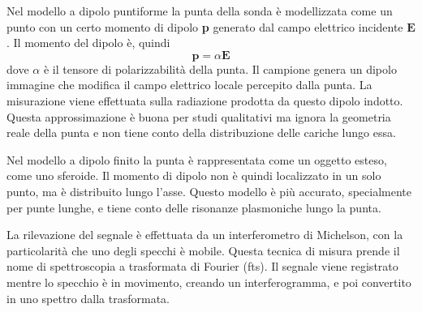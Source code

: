 \documentclass[../main.tex]{subfiles}
\begin{document}
Nel modello a dipolo puntiforme la punta della sonda è modellizzata come un punto con un certo momento di dipolo \textbf{p} generato dal campo elettrico incidente $\mathbf{E}$. Il momento del dipolo è, quindi
\begin{equation}
	\mathbf{p}=\alpha\mathbf{E}
\end{equation}
dove $\alpha$ è il tensore di polarizzabilità della punta. Il campione genera un dipolo immagine che modifica il campo elettrico locale percepito dalla punta. La misurazione viene effettuata sulla radiazione prodotta da questo dipolo indotto. Questa approssimazione è buona per studi qualitativi ma ignora la geometria reale della punta e non tiene conto della distribuzione delle cariche lungo essa.\cite{wu_2005}

Nel modello a dipolo finito la punta è rappresentata come un oggetto esteso, come uno sferoide. Il momento di dipolo non è quindi localizzato in un solo punto, ma è distribuito lungo l'asse. Questo modello è più accurato, specialmente per punte lunghe, e tiene conto delle risonanze plasmoniche lungo la punta.\cite{jarzembski_2017}

La rilevazione del segnale è effettuata da un interferometro di Michelson, con la particolarità che uno degli specchi è mobile. Questa tecnica di misura prende il nome di spettroscopia a trasformata di Fourier (\acrshort{fts}). Il segnale viene registrato mentre lo specchio è in movimento, creando un interferogramma, e poi convertito in uno spettro dalla trasformata.\cite{moreno_2017}
\end{document}
